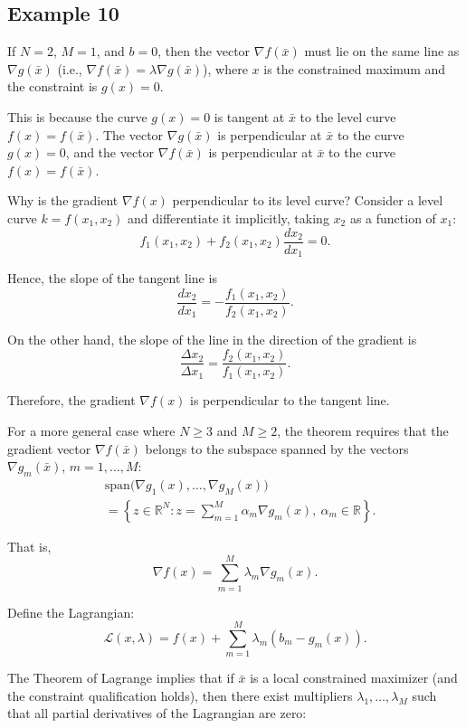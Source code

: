 \vspace{1em}

\subsection*{Example 10}

If $N=2$, $M=1$, and $b=0$, then the vector $\nabla f(\bar x)$ must lie on the same line as $\nabla g(\bar x)$ (i.e., $\nabla f(\bar x)=\lambda \nabla g(\bar x)$), where $x$ is the constrained maximum and the constraint is $g(x)=0$.

This is because the curve $g(x)=0$ is tangent at $\bar x$ to the level curve $f(x)=f(\bar x)$.
The vector $\nabla g(\bar x)$ is perpendicular at $\bar x$ to the curve $g(x)=0$, and the vector $\nabla f(\bar x)$ is perpendicular at $\bar x$ to the curve $f(x)=f(\bar x)$.

\medskip

Why is the gradient $\nabla f(x)$ perpendicular to its level curve?
Consider a level curve $k=f(x_1,x_2)$ and differentiate it implicitly, taking $x_2$ as a function of $x_1$:
\[
f_1(x_1,x_2) + f_2(x_1,x_2)\frac{dx_2}{dx_1}=0.
\]

Hence, the slope of the tangent line is
\[
\frac{dx_2}{dx_1} = -\frac{f_1(x_1,x_2)}{f_2(x_1,x_2)}.
\]

On the other hand, the slope of the line in the direction of the gradient is
\[
\frac{\Delta x_2}{\Delta x_1} = \frac{f_2(x_1,x_2)}{f_1(x_1,x_2)}.
\]

Therefore, the gradient $\nabla f(x)$ is perpendicular to the tangent line.

\medskip

For a more general case where $N \ge 3$ and $M \ge 2$, the theorem requires that the gradient vector $\nabla f(\bar x)$ belongs to the subspace spanned by the vectors $\nabla g_m(\bar x)$, $m=1,\dots,M$:
\[
\begin{aligned}
&\mathrm{span}\big(\nabla g_1(x),\dots,\nabla g_M(x)\big)\\
&=
\left\{
z \in \mathbb{R}^N : z = \sum_{m=1}^M \alpha_m \nabla g_m(x),\ \alpha_m \in \mathbb{R}
\right\}.
\end{aligned}
\]

That is,
\[
\nabla f(x) = \sum_{m=1}^M \lambda_m \nabla g_m(x).
\]
\medskip

Define the Lagrangian:
\[
\mathcal{L}(x,\lambda)
=
f(x) + \sum_{m=1}^M \lambda_m (b_m - g_m(x)).
\]

The Theorem of Lagrange implies that if $\bar x$ is a local constrained maximizer
(and the constraint qualification holds), then there exist multipliers
$\lambda_1,\dots,\lambda_M$ such that all partial derivatives of the Lagrangian
are zero:

